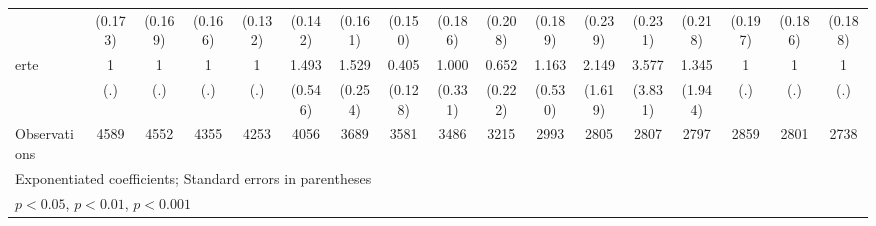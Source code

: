 {\begin{tabular}{l*{16}{c}}
                    &     (0.173)         &     (0.169)         &     (0.166)         &     (0.132)         &     (0.142)         &     (0.161)         &     (0.150)         &     (0.186)         &     (0.208)         &     (0.189)         &     (0.239)         &     (0.231)         &     (0.218)         &     (0.197)         &     (0.186)         &     (0.188)         \\
[1em]
erte                &           1         &           1         &           1         &           1         &       1.493         &       1.529\sym{*}  &       0.405\sym{**} &       1.000         &       0.652         &       1.163         &       2.149         &       3.577         &       1.345         &           1         &           1         &           1         \\
                    &         (.)         &         (.)         &         (.)         &         (.)         &     (0.546)         &     (0.254)         &     (0.128)         &     (0.331)         &     (0.222)         &     (0.530)         &     (1.619)         &     (3.831)         &     (1.944)         &         (.)         &         (.)         &         (.)         \\
\hline
Observations        &        4589         &        4552         &        4355         &        4253         &        4056         &        3689         &        3581         &        3486         &        3215         &        2993         &        2805         &        2807         &        2797         &        2859         &        2801         &        2738         \\
\hline\hline
\multicolumn{17}{l}{\footnotesize Exponentiated coefficients; Standard errors in parentheses}\\
\multicolumn{17}{l}{\footnotesize \sym{*} \(p<0.05\), \sym{**} \(p<0.01\), \sym{***} \(p<0.001\)}\\
\end{tabular}
}
